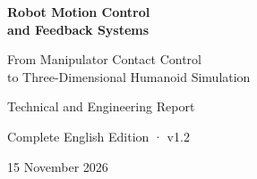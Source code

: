 

\hypersetup{pageanchor=false}
\begin{titlepage}
\centering\vspace*{24mm}
{\Huge\bfseries Robot Motion Control\\[4mm]and Feedback Systems\par}
\vspace{12mm}
{\Large From Manipulator Contact Control\\[3mm]to Three-Dimensional Humanoid Simulation\par}
\vspace{15mm}
{\Large Technical and Engineering Report\par}
\vfill
{\large Complete English Edition · v1.2\par}
\vspace{5mm}
{\large 15 November 2026\par}
\vspace*{22mm}
\end{titlepage}
\frontmatter\hypersetup{pageanchor=true}

\tableofcontents\listoffigures\listoftables
\mainmatter










\appendix




\backmatter

